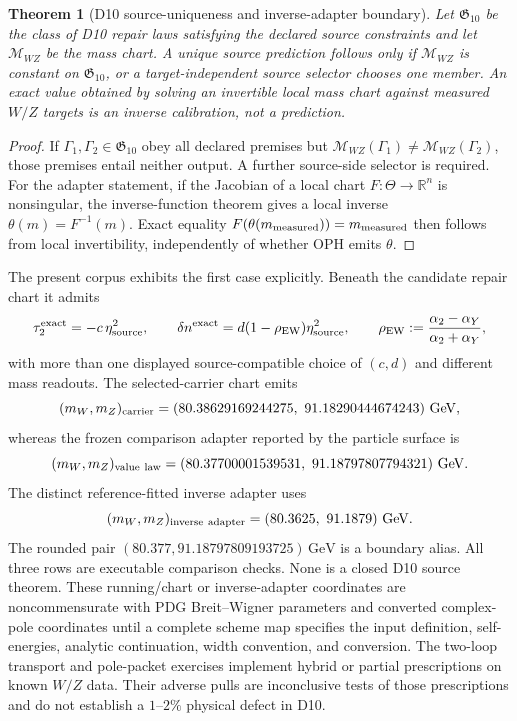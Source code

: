 \documentclass[11pt]{article}
\newtheorem{theorem}{Theorem}[section]
\begin{document}
\begin{theorem}[D10 source-uniqueness and inverse-adapter boundary]
Let \(\mathfrak G_{10}\) be the class of D10 repair laws satisfying the
declared source constraints and let \(\mathcal M_{WZ}\) be the mass chart.  A
unique source prediction follows only if \(\mathcal M_{WZ}\) is constant on
\(\mathfrak G_{10}\), or a target-independent source selector chooses one
member.  An exact value obtained by solving an invertible local mass chart
against measured \(W/Z\) targets is an inverse calibration, not a prediction.
\end{theorem}

\begin{proof}
If \(\Gamma_1,\Gamma_2\in\mathfrak G_{10}\) obey all declared premises but
\(\mathcal M_{WZ}(\Gamma_1)\ne\mathcal M_{WZ}(\Gamma_2)\), those premises
entail neither output.  A further source-side selector is required.  For the
adapter statement, if the Jacobian of a local chart \(F:\Theta\to\mathbb R^n\)
is nonsingular, the inverse-function theorem gives a local inverse
\(\theta(m)=F^{-1}(m)\).  Exact equality
\(F(\theta(m_{\rm measured}))=m_{\rm measured}\) then follows from local
invertibility, independently of whether OPH emits \(\theta\).
\end{proof}

The present corpus exhibits the first case explicitly.  Beneath the candidate
repair chart it admits
\[
\tau_2^{\rm exact}=-c\,\eta_{\rm source}^2,
\qquad
\delta n^{\rm exact}=d(1-\rho_{\rm EW})\eta_{\rm source}^2,
\qquad
\rho_{\rm EW}:=\frac{\alpha_2-\alpha_Y}{\alpha_2+\alpha_Y},
\]
with more than one displayed source-compatible choice of \((c,d)\) and
different mass readouts.  The selected-carrier chart emits
\[
(m_W,m_Z)_{\rm carrier}
=(80.38629169244275,\ 91.18290444674243)\ {\rm GeV},
\]
whereas the frozen comparison adapter reported by the particle surface is
\[
(m_W,m_Z)_{\rm value\ law}
=(80.37700001539531,\ 91.18797807794321)\ {\rm GeV}.
\]
The distinct reference-fitted inverse adapter uses
\[
(m_W,m_Z)_{\rm inverse\ adapter}
=(80.3625,\ 91.1879)\ {\rm GeV}.
\]
The rounded pair \((80.377,91.18797809193725)\,\mathrm{GeV}\) is a boundary
alias. All three rows are executable comparison checks.
None is a closed D10 source theorem. These running/chart or inverse-adapter coordinates are
noncommensurate with PDG Breit--Wigner parameters and converted complex-pole coordinates until a
complete scheme map specifies the input definition, self-energies, analytic continuation, width
convention, and conversion. The two-loop transport and pole-packet exercises implement
hybrid or partial prescriptions on known \(W/Z\) data. Their adverse pulls are inconclusive tests of
those prescriptions and do not establish a \(1\)--\(2\%\) physical defect in D10.
\end{document}
